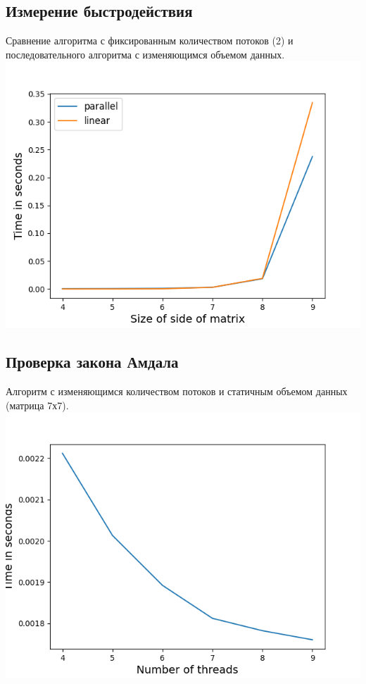 \documentclass[a4paper, 12pt]{article}
\begin{document}
\cleardoublepage

\subsection{Измерение быстродействия}
Сравнение алгоритма с фиксированным количеством потоков (2) и последовательного
алгоритма с изменяющимся объемом данных. \\
\includegraphics{plot1.png} 

\cleardoublepage

\subsection{Проверка закона Амдала}
Алгоритм с изменяющимся количеством потоков и статичным объемом данных (матрица 7х7). \\
\includegraphics{plot2.png} 
\end{document}
